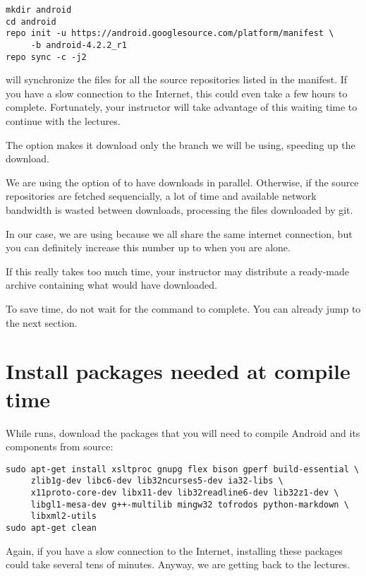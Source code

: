 \begin{verbatim}
mkdir android
cd android
repo init -u https://android.googlesource.com/platform/manifest \
     -b android-4.2.2_r1
repo sync -c -j2
\end{verbatim}

 will synchronize the files for all the source
repositories listed in the manifest. If you have a slow connection to
the Internet, this could even take a few hours to
complete. Fortunately, your instructor will take advantage of this
waiting time to continue with the lectures.

The  option makes it download only the branch we will be
using, speeding up the download.

We are using the  option of  to have 
downloads in parallel. Otherwise, if the source repositories are fetched
sequencially, a lot of time and available network bandwidth is wasted
between downloads, processing the files downloaded by git.

In our case, we are using  because we all share the same
internet connection, but you can definitely increase this number up to
\code{8} when you are alone.

If this really takes too much time, your instructor may distribute a
ready-made archive containing what \code{repo sync} would have
downloaded.

To save time, do not wait for the  command to
complete. You can already jump to the next section.

\section{Install packages needed at compile time}

While  runs, download the packages that you will need
to compile Android and its components from source:

\begin{verbatim}
sudo apt-get install xsltproc gnupg flex bison gperf build-essential \
     zlib1g-dev libc6-dev lib32ncurses5-dev ia32-libs \
     x11proto-core-dev libx11-dev lib32readline6-dev lib32z1-dev \
     libgl1-mesa-dev g++-multilib mingw32 tofrodos python-markdown \
     libxml2-utils
sudo apt-get clean
\end{verbatim}

Again, if you have a slow connection to the Internet, installing these
packages could take several tens of minutes. Anyway, we are getting
back to the lectures.

